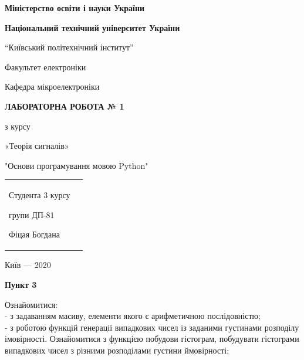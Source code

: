 \documentclass[a4paper,12pt]{article}
\begin{document}
\pagecolor{white}
\pagestyle{plain}
\begin{center}
   \begin{center} 
   \large{\textbf{Міністерство освіти і науки України} \par 
   \textbf{Національний технічний університет України}}\par
	“Київський політехнічний інститут”\par
	 Факультет електроніки\par
    	Кафедра мікроелектроніки\par
    \end{center}
    \vspace{4cm}
    
   	{\bfseries ЛАБОРАТОРНА РОБОТА № 1\par}
        \vspace{1cm}
        \large
        {
    	з курсу\par
    	«Теорія сигналів» \par
      	"Основи програмування мовою Python" \par  
	}
	\end{center}

       \vspace{7cm}
       \begin{tabularx}{\textwidth}{Xr}
        \flushright
           \begin{large} 
        Студента 3 курсу\par
 	групи ДП-81\par
	Фіцая Богдана\par
	 \end{large}
	\end{tabularx}
   
   \vfill
   \begin{center}
    {Київ} --- 2020
    \end{center}
 \newpage   

\begin{center}
\textbf{Пункт 3}\par
\end{center}
Ознайомитися:\\
- з задаванням масиву, елементи якого є арифметичною послідовністю;\\
- з роботою функцій генерації випадкових чисел із заданими густинами розподілу імовірності. Ознайомитися з функцією побудови гістограм, побудувати гістограми випадкових чисел з різними розподілами густини ймовірності;\\
\end{document}
